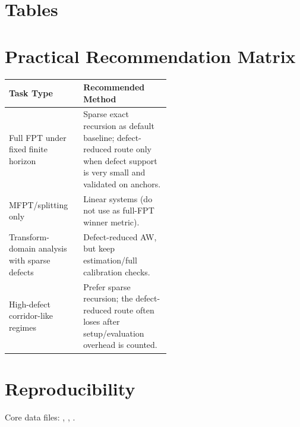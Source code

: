 \documentclass[11pt]{article}
\begin{document}
\section{Tables}
\begin{table}[H]
\centering
\small
\caption{Runtime ratio summary by defect bin and horizon.}
\resizebox{\linewidth}{!}{}
\end{table}
\begin{table}[H]
\centering
\small
\caption{Anchor workload runtime baselines.}
\resizebox{\linewidth}{!}{}
\end{table}
\section{Practical Recommendation Matrix}
\begin{table}[H]
\centering
\small
\begin{tabular}{@{}l>{\raggedright\arraybackslash}p{0.54\linewidth}@{}}
\toprule
Task Type & Recommended Method \\
\midrule
Full FPT under fixed finite horizon & Sparse exact recursion as default baseline; defect-reduced route only when defect support is very small and validated on anchors. \\
MFPT/splitting only & Linear systems (do not use as full-FPT winner metric). \\
Transform-domain analysis with sparse defects & Defect-reduced AW, but keep estimation/full calibration checks. \\
High-defect corridor-like regimes & Prefer sparse recursion; the defect-reduced route often loses after setup/evaluation overhead is counted. \\
\bottomrule
\end{tabular}
\end{table}
\section{Reproducibility}
Core data files: , , .
\end{document}

